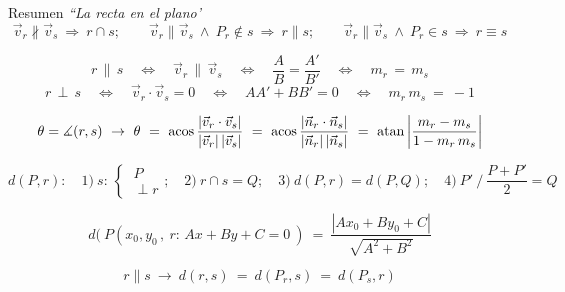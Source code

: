 \begin{myblock}{Resumen \emph{``La recta en el plano'}}
$$\vec v_r \not \parallel \vec v_s \ \Rightarrow \ r\cap s; \qquad \vec v_r  \parallel \vec v_s \ \wedge \ P_r \notin s \ \Rightarrow \ r\parallel s;
\qquad \vec v_r  \parallel \vec v_s \ \wedge \ P_r \in s \ \Rightarrow \ r\equiv s$$

$$   r\, \parallel \, s \quad \Leftrightarrow \quad  \vec v_r\, \parallel \, \vec v_s \quad \Leftrightarrow \quad \dfrac{A}{B}=\dfrac{A'}{B'} \quad \Leftrightarrow \quad m_r\, = \, m_s $$	
\vspace{-4mm}
$$  r\, \perp \, s \quad \Leftrightarrow \quad  \vec v_r \cdot  \vec v_s=0 \quad \Leftrightarrow \quad AA'+BB'=0 \quad \Leftrightarrow \quad  m_r\, m_s \ = \ -1 $$	

$$\theta=\measuredangle(r,s) \ \to \ \theta\ =\ \acos \dfrac{|\vec v_r \cdot \vec v_s|}{|\vec v_r|\, |\vec v_s|}\ =\ \acos \dfrac{|\vec n_r \cdot \vec n_s|}{|\vec n_r|\, |\vec n_s|}\ =\ \atan \left| \dfrac{m_r-m_s}{1-m_r\, m_s}\right|$$

$$d(P,r):\quad 1)\ s:\, \begin{cases} \ P\\ \ \perp r \end{cases};\quad 2)\ r\cap s=Q;\quad 3)\ d(P,r)=d(P,Q);\quad 4)\ P'\ / \ \dfrac{P+P'}{2}=Q$$

\vspace{-4mm}$$ d(\ P(x_0,y_0\, , \ r:\, Ax+By+C=0 \ )\ = \ \dfrac{|Ax_0+By_0+C|}{\sqrt{A^2+B^2}}$$

$$r\parallel s \ \to \ d(r,s)\ = \ d(P_r,s) \ = \ d(P_s,r)$$

\vspace{1mm}
	
\end{myblock}




